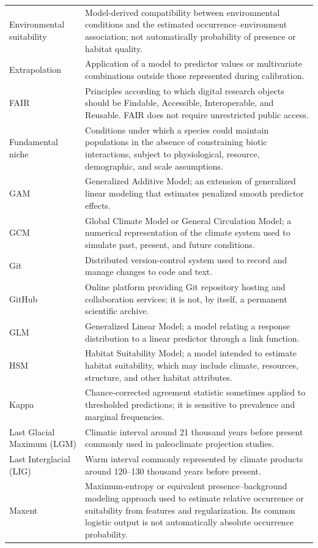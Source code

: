 \begin{longtable}{p{}p{}}
Environmental suitability & Model-derived compatibility between environmental conditions and the estimated occurrence--environment association; not automatically probability of presence or habitat quality. \\
Extrapolation & Application of a model to predictor values or multivariate combinations outside those represented during calibration. \\
FAIR & Principles according to which digital research objects should be Findable, Accessible, Interoperable, and Reusable. FAIR does not require unrestricted public access. \\
Fundamental niche & Conditions under which a species could maintain populations in the absence of constraining biotic interactions, subject to physiological, resource, demographic, and scale assumptions. \\
GAM & Generalized Additive Model; an extension of generalized linear modeling that estimates penalized smooth predictor effects. \\
GCM & Global Climate Model or General Circulation Model; a numerical representation of the climate system used to simulate past, present, and future conditions. \\
Git & Distributed version-control system used to record and manage changes to code and text. \\
GitHub & Online platform providing Git repository hosting and collaboration services; it is not, by itself, a permanent scientific archive. \\
GLM & Generalized Linear Model; a model relating a response distribution to a linear predictor through a link function. \\
HSM & Habitat Suitability Model; a model intended to estimate habitat suitability, which may include climate, resources, structure, and other habitat attributes. \\
Kappa & Chance-corrected agreement statistic sometimes applied to thresholded predictions; it is sensitive to prevalence and marginal frequencies. \\
Last Glacial Maximum (LGM) & Climatic interval around 21 thousand years before present commonly used in paleoclimate projection studies. \\
Last Interglacial (LIG) & Warm interval commonly represented by climate products around 120--130 thousand years before present. \\
Maxent & Maximum-entropy or equivalent presence--background modeling approach used to estimate relative occurrence or suitability from features and regularization. Its common logistic output is not automatically absolute occurrence probability. \\

\end{longtable}
